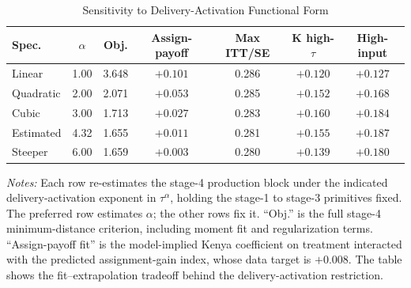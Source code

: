 \begin{table}[H]
\centering
\caption{Sensitivity to Delivery-Activation Functional Form}
\label{tab:struct_delivery_activation}
\begin{threeparttable}
\scriptsize
\begin{tabular}[t]{@{}lcccccc@{}}
\toprule
Spec. & $\alpha$ & Obj. & Assign-payoff & Max ITT/SE & K high-$\tau$ & High-input \\
\midrule
Linear & 1.00 & 3.648 & $+0.101$ & 0.286 & $+0.120$ & $+0.127$ \\
Quadratic & 2.00 & 2.071 & $+0.053$ & 0.285 & $+0.152$ & $+0.168$ \\
Cubic & 3.00 & 1.713 & $+0.027$ & 0.283 & $+0.160$ & $+0.184$ \\
Estimated & 4.32 & 1.655 & $+0.011$ & 0.281 & $+0.155$ & $+0.187$ \\
Steeper & 6.00 & 1.659 & $+0.003$ & 0.280 & $+0.139$ & $+0.180$ \\
\bottomrule
\end{tabular}
\begin{tablenotes}
\footnotesize
\item \textit{Notes:} Each row re-estimates the stage-4 production block under the indicated delivery-activation exponent in $\tau^{\alpha}$, holding the stage-1 to stage-3 primitives fixed. The preferred row estimates $\alpha$; the other rows fix it. ``Obj.'' is the full stage-4 minimum-distance criterion, including moment fit and regularization terms. ``Assign-payoff fit'' is the model-implied Kenya coefficient on treatment interacted with the predicted assignment-gain index, whose data target is $+0.008$. The table shows the fit--extrapolation tradeoff behind the delivery-activation restriction.
\end{tablenotes}
\end{threeparttable}
\end{table}
